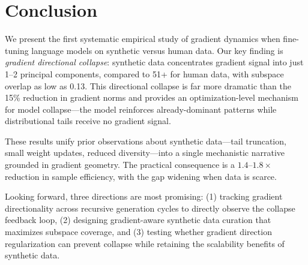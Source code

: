 \section{Conclusion}
\label{sec:conclusion}

We present the first systematic empirical study of gradient dynamics when fine-tuning language models on synthetic versus human data. Our key finding is \emph{gradient directional collapse}: synthetic data concentrates gradient signal into just 1--2 principal components, compared to 51+ for human data, with subspace overlap as low as 0.13. This directional collapse is far more dramatic than the 15\% reduction in gradient norms and provides an optimization-level mechanism for model collapse---the model reinforces already-dominant patterns while distributional tails receive no gradient signal.

These results unify prior observations about synthetic data---tail truncation, small weight updates, reduced diversity---into a single mechanistic narrative grounded in gradient geometry. The practical consequence is a $1.4$--$1.8\times$ reduction in sample efficiency, with the gap widening when data is scarce.

Looking forward, three directions are most promising: (1) tracking gradient directionality across recursive generation cycles to directly observe the collapse feedback loop, (2) designing gradient-aware synthetic data curation that maximizes subspace coverage, and (3) testing whether gradient direction regularization can prevent collapse while retaining the scalability benefits of synthetic data.
